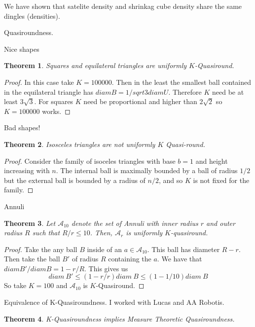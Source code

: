 \documentclass[letter]{article}
\newtheorem{theorem}{Theorem}
\newenvironment{menumerate}{%
  \edef\backupindent{\the\parindent}%
  \enumerate%
  \setlength{\parindent}{\backupindent}%
}{\endenumerate}
\begin{document}
\begin{menumerate}
	We have shown that satelite density and shrinkag cube density share the same dingles (densities).
	\item Quasiroundness.
	\begin{menumerate}
		\item Nice shapes
		\begin{theorem}
			Squares and equilateral triangles are uniformly $K$-Quasiround.
		\end{theorem}
		\begin{proof}
		In this case take $K = 100000.$ Then
		in the least the smallest ball contained in the equilateral triangle has $diam B = 1/sqrt{3} diam U$. Therefore $K$ need be at least $3\sqrt{3}.$ For squares $K$ need be proportional and higher than $2\sqrt{2}$ so $K=100000$ works.
		\end{proof}
		\item Bad shapes!
		\begin{theorem}
		Isosceles triangles are not uniformly $K$ Quasi-round.
		\end{theorem}
		\begin{proof}
			Consider the family of isoceles triangles with base $b=1$ and height increasing with $n$. The internal ball is maximally bounded by a ball of radius $1/2$ but the external ball is bounded by a radius of $n/2$, and so $K$ is not fixed for the family.
		\end{proof}
		\item Annuli
		\begin{theorem}
			Let $\mathcal{A}_{10}$ denote the set of Annuli with inner radius $r$ and outer radius $R$ such that $R/r \leq 10$. Then, $\mathcal{A}_r$ is uniformly $K$-quasiround.
		\end{theorem}
		\begin{proof}
			Take the any ball $B$ inside of an $a \in \mathcal{A}_{10}$. This ball has diameter $R-r$. Then take the ball $B'$ of radius $R$ containing the $a$.
			We have that $diam B' / diam B  = 1 - r/R.$ This gives us
			\begin{equation}
			 diam\ B' \leq (1 - r/r)diam\ B \leq (1 - 1/10) diam\  B
			 \end{equation} 
			 So take $K = 100$ and $\mathcal{A}_{10}$ is $K$-Quasiround.
		\end{proof}
	\end{menumerate}
	\item Equivalence of K-Quasiroundness. I worked with Lucas and AA Robotis. 
	\begin{theorem}
		K-Quasiroundness implies Measure Theoretic Quasiroundness.

\end{theorem}
\end{menumerate}
\end{document}
